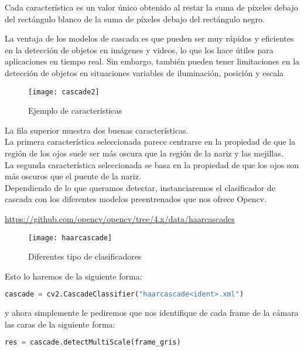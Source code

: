 Cada característica es un valor único obtenido al restar la suma de píxeles 
debajo del rectángulo blanco de la suma de píxeles debajo del rectángulo negro.

La ventaja de los modelos de cascada es que pueden ser muy rápidos y eficientes 
en la detección de objetos en imágenes y videos, lo que los hace útiles para 
aplicaciones en tiempo real. Sin embargo, también pueden tener limitaciones en 
la detección de objetos en situaciones variables de iluminación, posición y escala



\begin{figure}[H]
  \centering
  \texttt{[image: cascade2]}
  \caption{Ejemplo de características}\label{fig:ejemplo_característica}
\end{figure}

La fila superior muestra dos buenas características.\\
La primera característica seleccionada parece centrarse en la propiedad de 
que la región de los ojos suele ser más oscura que la región de la nariz y las mejillas.\\ 
La segunda característica seleccionada se basa en la propiedad de que los ojos son más 
oscuros que el puente de la nariz.\\


Dependiendo de lo que queramos detectar, instanciaremos el clasificador de 
cascada con los diferentes modelos preentrenados que nos ofrece Opencv.

\url{https://github.com/opencv/opencv/tree/4.x/data/haarcascades}

\begin{figure}[H]
  \centering
  \texttt{[image: haarcascade]}
  \caption{Diferentes tipo de clasificadores}\label{fig:ejemplo_característica}
\end{figure}

Esto lo haremos de la siguiente forma:

\begin{lstlisting}[language=Python]
  cascade = cv2.CascadeClassifier("haarcascade<ident>.xml")
\end{lstlisting}

y ahora simplemente le pediremos que nos identifique de cada frame de la cámara las caras de la siguiente forma:

\begin{lstlisting}[language=Python]
  res = cascade.detectMultiScale(frame_gris)
\end{lstlisting}

